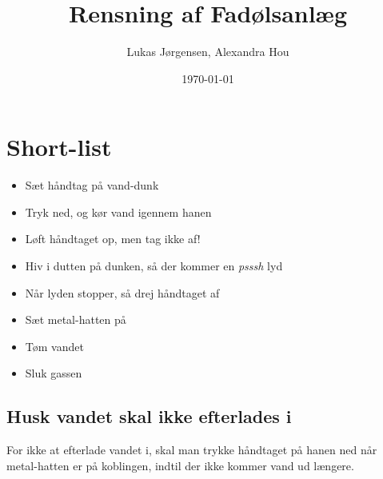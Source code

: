 

\title{Rensning af Fadølsanlæg}
\date{\today}
\author{Lukas Jørgensen, Alexandra Hou}



\maketitle

\section{Short-list}

\begin{itemize}
  \item Sæt håndtag på vand-dunk
  \item Tryk ned, og kør vand igennem hanen
  \item Løft håndtaget op, men tag ikke af!
  \item Hiv i dutten på dunken, så der kommer en \textit{psssh} lyd
  \item Når lyden stopper, så drej håndtaget af
  \item Sæt metal-hatten på
  \item Tøm vandet
  \item Sluk gassen
\end{itemize}

\subsection{Husk vandet skal ikke efterlades i}
For ikke at efterlade vandet i, skal man trykke håndtaget på
hanen ned når metal-hatten er på koblingen, indtil der ikke kommer
vand ud længere.

